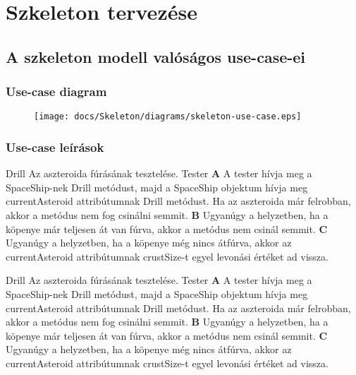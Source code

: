 \documentclass[../../projlab]{subfiles}
\begin{document}
\makeatletter


\makeatother

\chapter{Szkeleton tervezése}


\section{A szkeleton modell valóságos use-case-ei}

\subsection{Use-case diagram}
\begin{figure}[H] 
    \centering 
    \texttt{[image: docs/Skeleton/diagrams/skeleton-use-case.eps]} 
    \caption{} 
\end{figure} 

\subsection{Use-case leírások}
\begin{use-case}
    {Drill}
    {Az aszteroida fúrásának tesztelése.}
    {Tester} 
    \textbf{A} A tester hívja meg a SpaceShip-nek Drill metódust, majd a SpaceShip objektum hívja meg currentAsteroid attribútumnak Drill metódust. Ha az aszteroida már felrobban, akkor a metódus nem fog csinálni semmit. \newline
    \textbf{B} Ugyanúgy a helyzetben, ha a köpenye már teljesen át van fúrva, akkor a metódus nem csinál semmit. \newline
    \textbf{C} Ugyanúgy a helyzetben, ha a köpenye még nincs átfúrva, akkor az currentAsteroid attribútumnak crustSize-t egyel levonási értéket ad vissza. \newline
\end{use-case}


\begin{use-case}
    {Drill}
    {Az aszteroida fúrásának tesztelése.}
    {Tester} 
    \textbf{A} A tester hívja meg a SpaceShip-nek Drill metódust, majd a SpaceShip objektum hívja meg currentAsteroid attribútumnak Drill metódust. Ha az aszteroida már felrobban, akkor a metódus nem fog csinálni semmit. \newline
    \textbf{B} Ugyanúgy a helyzetben, ha a köpenye már teljesen át van fúrva, akkor a metódus nem csinál semmit. \newline
    \textbf{C} Ugyanúgy a helyzetben, ha a köpenye még nincs átfúrva, akkor az currentAsteroid attribútumnak crustSize-t egyel levonási értéket ad vissza. \newline
\end{use-case}
\end{document}
